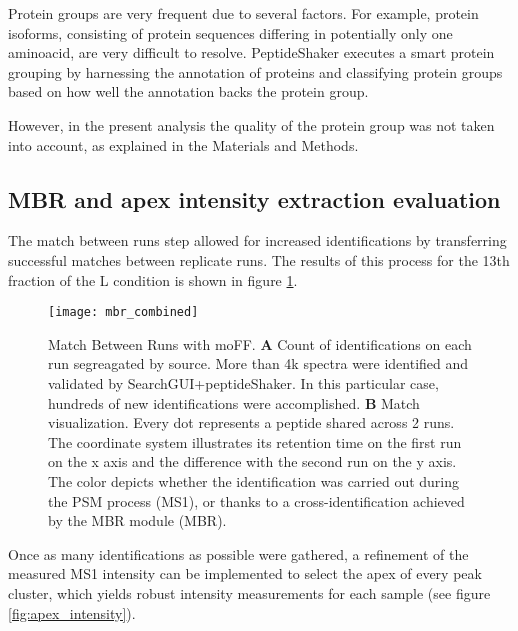 Protein groups are very frequent due to several factors. For example, protein isoforms, consisting of protein sequences differing in potentially only one aminoacid, are very difficult to resolve. PeptideShaker executes a smart protein grouping by harnessing the annotation of proteins and classifying protein groups based on how well the annotation backs the protein group.

However, in the present analysis the quality of the protein group was not taken into account, as explained in the Materials and Methods.


\subsection{MBR and apex intensity extraction evaluation}

The match between runs step allowed for increased identifications by transferring successful matches between replicate runs. The results of this process for the 13th fraction of the L condition is shown in figure \ref{fig:mbr}.

\begin{figure}[H]
\centering
\texttt{[image: mbr\_combined]}
\caption{Match Between Runs with moFF. \textbf{A} Count of identifications on each run segreagated by source. More than 4k spectra were identified and validated by SearchGUI+peptideShaker. In this particular case, hundreds of new identifications were accomplished. \textbf{B} Match visualization. Every dot represents a peptide shared across 2 runs. The coordinate system illustrates its retention time on the first run on the x axis and the difference with the second run on the y axis. The color depicts whether the identification was carried out during the PSM process (MS1), or thanks to a cross-identification achieved by the MBR module (MBR).}
\label{fig:mbr}
\end{figure}

Once as many identifications as possible were gathered, a refinement of the measured MS1 intensity can be implemented to select the apex of every peak cluster, which yields robust intensity measurements for each sample (see figure \ref{fig:apex_intensity}). 

